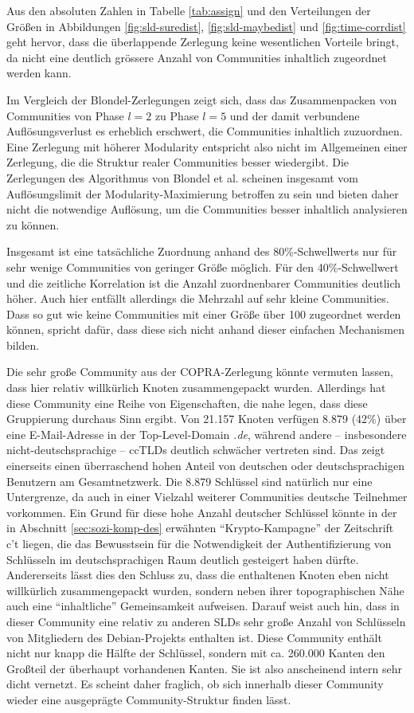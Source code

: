 Aus den absoluten Zahlen in Tabelle \ref{tab:assign} und den
Verteilungen der Größen in Abbildungen \ref{fig:sld-suredist},
\ref{fig:sld-maybedist} und \ref{fig:time-corrdist} geht hervor, dass
die \"uberlappende Zerlegung keine wesentlichen Vorteile bringt, da
nicht eine deutlich gr\"ossere Anzahl von Communities inhaltlich
zugeordnet werden kann. 

Im Vergleich der Blondel-Zerlegungen zeigt sich, dass das
Zusammenpacken von Communities von Phase $l=2$ zu Phase $l=5$ und der
damit verbundene Auflösungsverlust es erheblich erschwert, die
Communities inhaltlich zuzuordnen. Eine Zerlegung mit höherer
Modularity entspricht also nicht im Allgemeinen einer Zerlegung, die
die Struktur realer Communities besser wiedergibt. Die Zerlegungen des
Algorithmus von Blondel et al. scheinen insgesamt vom
Auflösungslimit der Modularity-Maximierung betroffen zu sein und
bieten daher nicht die notwendige Auflösung, um die Communities
besser inhaltlich analysieren zu können.

Insgesamt ist eine tatsächliche Zuordnung anhand des
80\%-Schwellwerts nur für sehr wenige Communities von geringer
Größe möglich. Für den 40\%-Schwellwert und die zeitliche
Korrelation ist die Anzahl zuordnenbarer Communities deutlich
höher. Auch hier entfällt allerdings die Mehrzahl auf sehr kleine
Communities.  Dass so gut wie keine Communities mit einer Größe
über 100 zugeordnet werden können, spricht dafür, dass diese
sich nicht anhand dieser einfachen Mechanismen bilden.

Die sehr große Community aus der COPRA-Zerlegung könnte vermuten
lassen, dass hier relativ willkürlich Knoten zusammengepackt
wurden. Allerdings hat diese Community eine Reihe von Eigenschaften,
die nahe legen, dass diese Gruppierung durchaus Sinn ergibt. Von 21.157
Knoten verfügen 8.879 (42\%) über eine E-Mail-Adresse in der
Top-Level-Domain \emph{.de}, während andere -- insbesondere
nicht-deutschsprachige -- ccTLDs deutlich schwächer vertreten
sind. Das zeigt einerseits einen überraschend hohen Anteil von
deutschen oder deutschsprachigen Benutzern am Gesamtnetzwerk. Die 8.879
Schlüssel sind natürlich nur eine Untergrenze, da auch in einer
Vielzahl weiterer Communities deutsche Teilnehmer vorkommen. Ein Grund
für diese hohe Anzahl deutscher Schlüssel könnte in der in
Abschnitt \ref{sec:sozi-komp-des} erwähnten "`Krypto-Kampagne"' der
Zeitschrift c't liegen, die das Bewusstsein für die Notwendigkeit
der Authentifizierung von Schlüsseln im deutschsprachigen Raum
deutlich gesteigert haben dürfte. Andererseits lässt dies den
Schluss zu, dass die enthaltenen Knoten eben nicht willkürlich
zusammengepackt wurden, sondern neben ihrer topographischen Nähe
auch eine "`inhaltliche"' Gemeinsamkeit aufweisen. Darauf weist auch
hin, dass in dieser Community eine relativ zu anderen SLDs sehr große
Anzahl von Schlüsseln von Mitgliedern des Debian-Projekts enthalten
ist. Diese Community enthält nicht nur knapp die Hälfte der
Schlüssel, sondern mit ca. 260.000 Kanten den Großteil der
überhaupt vorhandenen Kanten. Sie ist also anscheinend intern sehr
dicht vernetzt. Es scheint daher fraglich, ob sich innerhalb dieser
Community wieder eine ausgeprägte Community-Struktur finden lässt.

